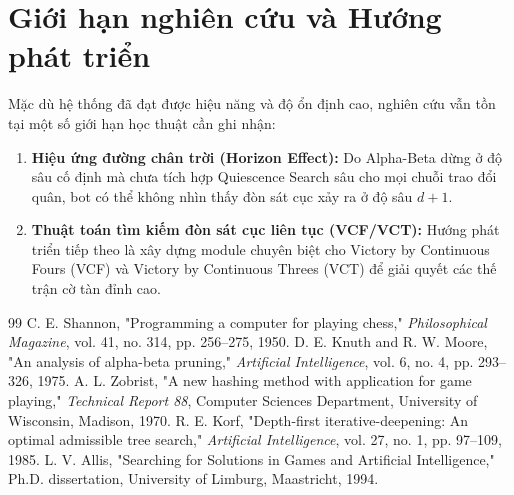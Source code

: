 \documentclass[11pt,a4paper]{report}
\begin{document}
\section{Giới hạn nghiên cứu và Hướng phát triển}
Mặc dù hệ thống đã đạt được hiệu năng và độ ổn định cao, nghiên cứu vẫn tồn tại một số giới hạn học thuật cần ghi nhận:
\begin{enumerate}
    \item \textbf{Hiệu ứng đường chân trời (Horizon Effect):} Do Alpha-Beta dừng ở độ sâu cố định mà chưa tích hợp Quiescence Search sâu cho mọi chuỗi trao đổi quân, bot có thể không nhìn thấy đòn sát cục xảy ra ở độ sâu $d+1$.
    \item \textbf{Thuật toán tìm kiếm đòn sát cục liên tục (VCF/VCT):} Hướng phát triển tiếp theo là xây dựng module chuyên biệt cho Victory by Continuous Fours (VCF) và Victory by Continuous Threes (VCT) để giải quyết các thế trận cờ tàn đỉnh cao.
\end{enumerate}

\begin{thebibliography}{99}
 C. E. Shannon, "Programming a computer for playing chess," \textit{Philosophical Magazine}, vol. 41, no. 314, pp. 256--275, 1950.
 D. E. Knuth and R. W. Moore, "An analysis of alpha-beta pruning," \textit{Artificial Intelligence}, vol. 6, no. 4, pp. 293--326, 1975.
 A. L. Zobrist, "A new hashing method with application for game playing," \textit{Technical Report 88}, Computer Sciences Department, University of Wisconsin, Madison, 1970.
 R. E. Korf, "Depth-first iterative-deepening: An optimal admissible tree search," \textit{Artificial Intelligence}, vol. 27, no. 1, pp. 97--109, 1985.
 L. V. Allis, "Searching for Solutions in Games and Artificial Intelligence," Ph.D. dissertation, University of Limburg, Maastricht, 1994.
\end{thebibliography}
\end{document}

